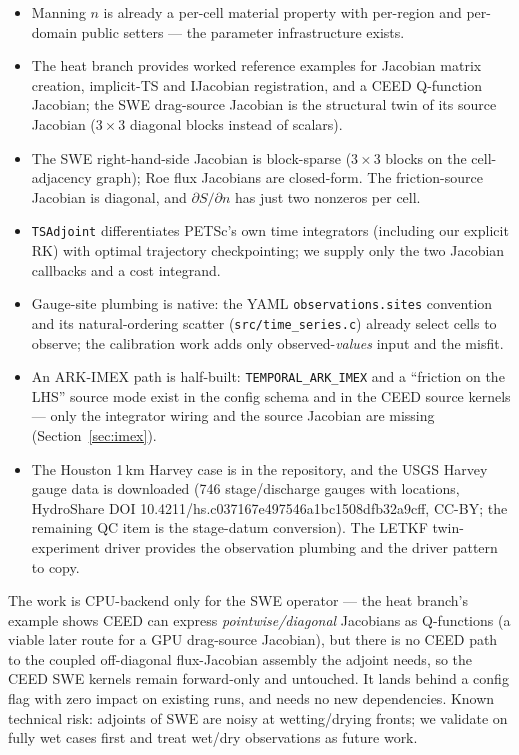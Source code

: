 \documentclass[11pt]{article}
\begin{document}
\begin{itemize}[nosep]
  \item Manning $n$ is already a per-cell material property with per-region
        and per-domain public setters --- the parameter infrastructure exists.
  \item The heat branch provides worked reference examples for Jacobian
        matrix creation, implicit-TS and IJacobian registration, and a
        CEED Q-function Jacobian; the SWE drag-source Jacobian is the
        structural twin of its source Jacobian ($3\times3$ diagonal
        blocks instead of scalars).
  \item The SWE right-hand-side Jacobian is block-sparse ($3\times3$ blocks
        on the cell-adjacency graph); Roe flux Jacobians are closed-form.
        The friction-source Jacobian is diagonal, and
        $\partial S/\partial n$ has just two nonzeros per cell.
  \item \texttt{TSAdjoint} differentiates PETSc's own time integrators
        (including our explicit RK) with optimal trajectory checkpointing;
        we supply only the two Jacobian callbacks and a cost integrand.
  \item Gauge-site plumbing is native: the YAML
        \texttt{observations.sites} convention and its natural-ordering
        scatter (\texttt{src/time\_series.c}) already select cells to
        observe; the calibration work adds only observed-\emph{values}
        input and the misfit.
  \item An ARK-IMEX path is half-built: \texttt{TEMPORAL\_ARK\_IMEX}
        and a ``friction on the LHS'' source mode exist in the config
        schema and in the CEED source kernels --- only the integrator
        wiring and the source Jacobian are missing
        (Section~\ref{sec:imex}).
  \item The Houston 1\,km Harvey case is in the repository, and the
        USGS Harvey gauge data is downloaded (746 stage/discharge
        gauges with locations, HydroShare DOI
        10.4211/hs.c037167e497546a1bc1508dfb32a9cff, CC-BY; the
        remaining QC item is the stage-datum conversion). The LETKF
        twin-experiment driver provides the observation plumbing and
        the driver pattern to copy.
\end{itemize}

The work is CPU-backend only for the SWE operator --- the heat branch's
example shows CEED can express \emph{pointwise/diagonal} Jacobians as
Q-functions (a viable later route for a GPU drag-source Jacobian), but
there is no CEED path to the coupled off-diagonal flux-Jacobian assembly
the adjoint needs, so the CEED SWE kernels remain forward-only and
untouched. It lands behind a config flag with zero
impact on existing runs, and needs no new dependencies. Known technical risk: adjoints of SWE are
noisy at wetting/drying fronts; we validate on fully wet cases first and
treat wet/dry observations as future work.
\end{document}
